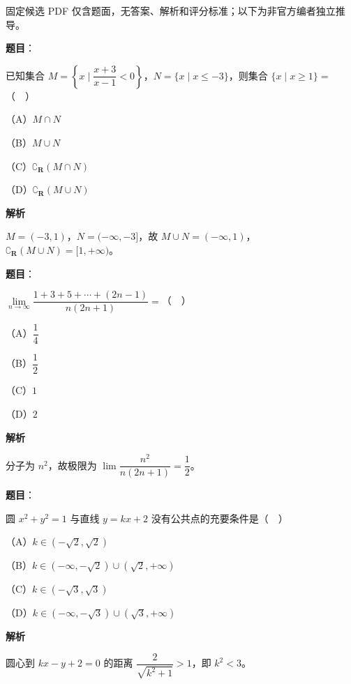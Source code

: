 

\begin{gktip}
固定候选 PDF 仅含题面，无答案、解析和评分标准；以下为非官方编者独立推导。
\end{gktip}

\begin{answer}

\textbf{题目}：

已知集合 $M=\left\{x\mid \dfrac{x+3}{x-1}<0\right\}$，$N=\{x\mid x\leqslant-3\}$，则集合 $\{x\mid x\geqslant1\}=$（　）

（A）$M\cap N$

（B）$M\cup N$

（C）$\complement_{\mathbf R}(M\cap N)$

（D）$\complement_{\mathbf R}(M\cup N)$

\textbf{解析}

$M=(-3,1)$，$N=(-\infty,-3]$，故 $M\cup N=(-\infty,1)$，$\complement_{\mathbf R}(M\cup N)=[1,+\infty)$。


\end{answer}
\begin{answer}

\textbf{题目}：

$\lim\limits_{n\to\infty}\dfrac{1+3+5+\cdots+(2n-1)}{n(2n+1)}=$（　）

（A）$\dfrac14$

（B）$\dfrac12$

（C）$1$

（D）$2$

\textbf{解析}

分子为 $n^2$，故极限为 $\lim\dfrac{n^2}{n(2n+1)}=\dfrac12$。


\end{answer}
\begin{answer}

\textbf{题目}：

圆 $x^2+y^2=1$ 与直线 $y=kx+2$ 没有公共点的充要条件是（　）

（A）$k\in(-\sqrt2,\sqrt2)$

（B）$k\in(-\infty,-\sqrt2)\cup(\sqrt2,+\infty)$

（C）$k\in(-\sqrt3,\sqrt3)$

（D）$k\in(-\infty,-\sqrt3)\cup(\sqrt3,+\infty)$

\textbf{解析}

圆心到 $kx-y+2=0$ 的距离 $\dfrac2{\sqrt{k^2+1}}>1$，即 $k^2<3$。


\end{answer}
